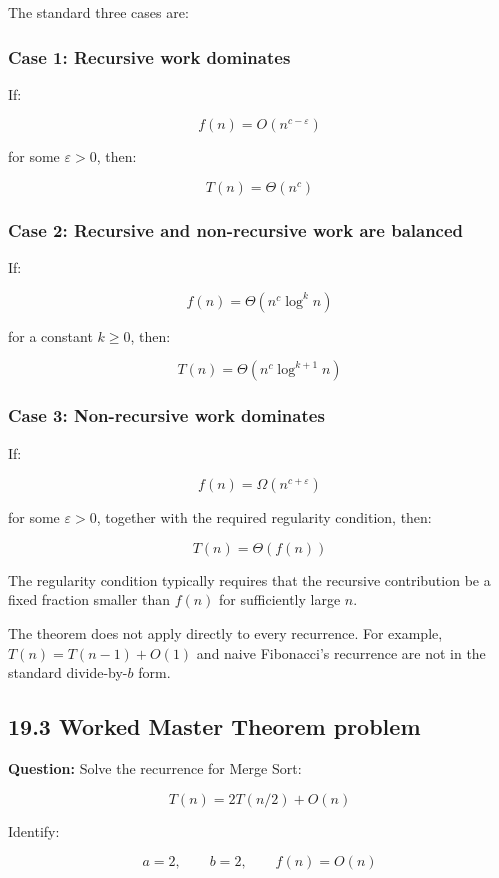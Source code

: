 The standard three cases are:

\subsubsection{Case 1: Recursive work dominates}

If:


\[
f(n)=O(n^{c-\varepsilon})
\]


for some $\varepsilon>0$, then:


\[
\boxed{T(n)=\Theta(n^c)}
\]


\subsubsection{Case 2: Recursive and non-recursive work are balanced}

If:


\[
f(n)=\Theta(n^c\log^k n)
\]


for a constant $k\geq0$, then:


\[
\boxed{T(n)=\Theta(n^c\log^{k+1}n)}
\]


\subsubsection{Case 3: Non-recursive work dominates}

If:


\[
f(n)=\Omega(n^{c+\varepsilon})
\]


for some $\varepsilon>0$, together with the required regularity condition, then:


\[
\boxed{T(n)=\Theta(f(n))}
\]


The regularity condition typically requires that the recursive contribution be a fixed fraction smaller than $f(n)$ for sufficiently large $n$.

The theorem does not apply directly to every recurrence. For example, $T(n)=T(n-1)+O(1)$ and naive Fibonacci's recurrence are not in the standard divide-by-$b$ form.

\subsection{19.3 Worked Master Theorem problem}

\textbf{Question:} Solve the recurrence for Merge Sort:


\[
T(n)=2T(n/2)+O(n)
\]


Identify:


\[
a=2,\qquad b=2,\qquad f(n)=O(n)
\]



